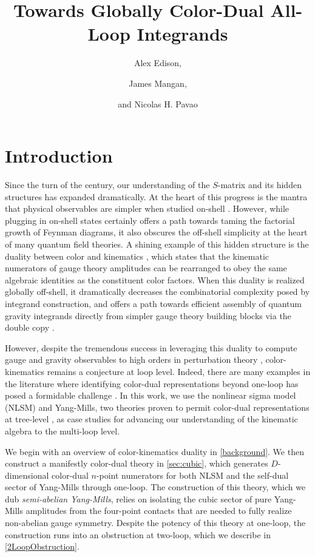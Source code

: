 \documentclass[11pt,letter]{article}
\author{\large Alex Edison,}
\author{\large James Mangan,}
\author{\large and Nicolas H. Pavao}
\affiliation{Department of Physics and Astronomy, Northwestern
  University, Evanston, Illinois 60208, USA}
\title{\center  \fontsize{18.8}{20} \selectfont  Towards Globally Color-Dual All-Loop Integrands}
\begin{document}
\maketitle
\flushbottom
 

\section{Introduction}\label{intro}
Since the turn of the century, our understanding of the $S$-matrix and
its hidden structures has expanded dramatically. At the heart of this
progress is the mantra that physical observables are simpler when
studied on-shell
\cite{Parke:1986gb,TasiLance,Cheung:2017pzi}. However, while plugging
in on-shell states certainly offers a path towards taming the
factorial growth of Feynman diagrams, it also obscures the off-shell
simplicity at the heart of many quantum field theories. A shining
example of this hidden structure is the duality between color and
kinematics \cite{BCJ,Bern:2010ue,BCJreview}, which states that the
kinematic numerators of gauge theory amplitudes can be rearranged to
obey the same algebraic identities as the constituent color
factors. When this duality is realized globally off-shell, it
dramatically decreases the combinatorial complexity posed by integrand
construction, and offers a path towards efficient assembly of quantum
gravity integrands directly from simpler gauge theory building blocks
via the double copy \cite{BCJ,Bern:2010ue}.

However, despite the tremendous success in leveraging this duality to
compute gauge and gravity observables to high orders in perturbation
theory \cite{FiveLoopN4, GeneralizedDoubleCopyFiveLoops, Bern:2018jmv,
  Carrasco:2021otn}, color-kinematics remains a conjecture at loop
level. Indeed, there are many examples in the literature where
identifying color-dual representations beyond one-loop has posed a
formidable challenge
\cite{Mogull:2015adi, Johansson:2017bfl, KalinN2TwoLoop, Bern:2015ooa}. In this work, we use
the nonlinear sigma model (NLSM) and Yang-Mills, two theories proven
to permit color-dual representations at tree-level
\cite{Feng:2010my,Cachazo:2014xea}, as case studies for advancing our
understanding of the kinematic algebra to the multi-loop level.

We begin with an overview of color-kinematics duality in
\cref{background}. We then construct a manifestly color-dual theory in
\cref{sec:cubic}, which generates $D$-dimensional color-dual $n$-point
numerators for both NLSM and the self-dual sector of Yang-Mills
through one-loop. The construction of this theory, which we dub
\textit{semi-abelian Yang-Mills}, relies on isolating the cubic sector
of pure Yang-Mills amplitudes from the four-point contacts that are
needed to fully realize non-abelian gauge symmetry. Despite the
potency of this theory at one-loop, the construction runs into an
obstruction at two-loop, which we describe in \cref{2LoopObstruction}.
\end{document}
